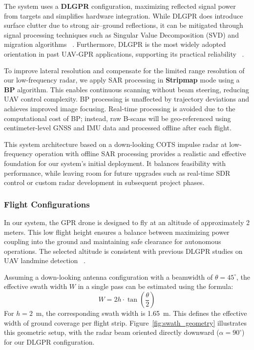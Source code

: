 The system uses a \textbf{DLGPR} configuration, maximizing reflected signal power from targets and simplifies hardware integration. While DLGPR does introduce surface clutter due to strong air–ground reflections, it can be mitigated through signal processing techniques such as Singular Value Decomposition (SVD) and migration algorithms ~\cite{garcia2024comparison}. Furthermore, DLGPR is the most widely adopted orientation in past UAV-GPR applications, supporting its practical reliability ~\cite{alqudsi2021review}.

To improve lateral resolution and compensate for the limited range resolution of our low-frequency radar, we apply SAR processing in \textbf{Stripmap} mode using a \textbf{BP} algorithm. This enables continuous scanning without beam steering, reducing UAV control complexity. BP processing is unaffected by trajectory deviations and achieves improved image focusing. Real-time processing is avoided due to the computational cost of BP; instead, raw B-scans will be geo-referenced using centimeter-level GNSS and IMU data and processed offline after each flight.


This system architecture based on a down-looking COTS impulse radar at low-frequency operation with offline SAR processing provides a realistic and effective foundation for our system’s initial deployment. It balances feasibility with performance, while leaving room for future upgrades such as real-time SDR control or custom radar development in subsequent project phases.



\subsubsection{Flight Configurations}

In our system, the GPR drone is designed to fly at an altitude of approximately 2 meters. This low flight height ensures a balance between maximizing power coupling into the ground and maintaining safe clearance for autonomous operations. The selected altitude is consistent with previous DLGPR studies on UAV landmine detection ~\cite{schartel2018uav,alqudsi2021review}.

Assuming a down-looking antenna configuration with a beamwidth of $\theta = 45^\circ$, the effective swath width $W$ in a single pass can be estimated using the formula:
\[
W = 2h \cdot \tan\left(\frac{\theta}{2}\right)
\]
For $h = 2$~m, the corresponding swath width is 1.65~m. This defines the effective width of ground coverage per flight strip. Figure~\ref{fig:swath_geometry} illustrates this geometric setup, with the radar beam oriented directly downward ($\alpha = 90^\circ$) for our DLGPR configuration.


